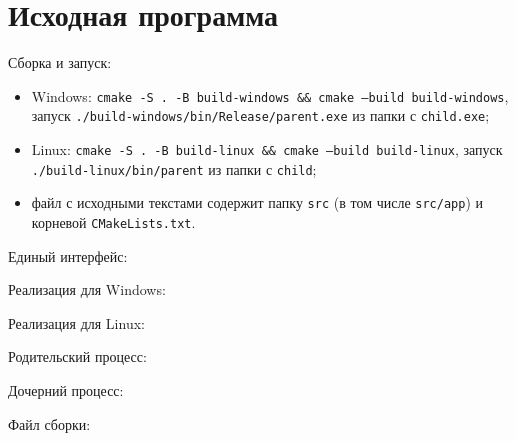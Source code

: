 \section{Исходная программа}

Сборка и запуск:
\begin{itemize}
  \item Windows: \texttt{cmake -S . -B build-windows \&\& cmake --build build-windows}, запуск
    \texttt{./build-windows/bin/Release/parent.exe} из папки с \texttt{child.exe};
  \item Linux: \texttt{cmake -S . -B build-linux \&\& cmake --build build-linux}, запуск
    \texttt{./build-linux/bin/parent} из папки с \texttt{child};
  \item файл с исходными текстами содержит папку \texttt{src} (в том числе \texttt{src/app}) и корневой
    \texttt{CMakeLists.txt}.
\end{itemize}

Единый интерфейс:

\begin{center}

\end{center}

Реализация для Windows:

\begin{center}

\end{center}

Реализация для Linux:

\begin{center}

\end{center}

Родительский процесс:

\begin{center}

\end{center}

Дочерний процесс:

\begin{center}

\end{center}

Файл сборки:

\begin{center}

\end{center}

